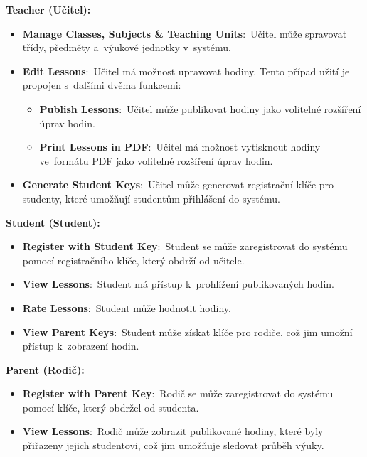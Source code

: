 \documentclass[male,czech,api_bc]{kitheses}
\begin{document}
\textbf{Teacher (Učitel):}
\begin{itemize}
	\item \textbf{Manage Classes, Subjects \& Teaching Units}:~Učitel může spravovat třídy, předměty a~výukové jednotky v~systému.
	\item \textbf{Edit Lessons}:~Učitel má možnost upravovat hodiny. Tento případ užití je propojen s~dalšími dvěma funkcemi:
	\begin{itemize}
		\item \textbf{Publish Lessons}:~Učitel může publikovat hodiny jako volitelné rozšíření úprav hodin.
		\item \textbf{Print Lessons in PDF}:~Učitel má možnost vytisknout hodiny ve~formátu PDF jako volitelné rozšíření úprav hodin.
	\end{itemize}
	\item \textbf{Generate Student Keys}:~Učitel může generovat registrační klíče pro studenty, které umožňují studentům přihlášení do systému.
\end{itemize}

\vspace{1em}
\textbf{Student (Student):}
\begin{itemize}
	\item \textbf{Register with Student Key}:~Student se může zaregistrovat do systému pomocí registračního klíče, který obdrží od učitele.
	\item \textbf{View Lessons}:~Student má přístup k~prohlížení publikovaných hodin.
	\item \textbf{Rate Lessons}:~Student může hodnotit hodiny.
	\item \textbf{View Parent Keys}:~Student může získat klíče pro rodiče, což jim umožní přístup k~zobrazení hodin.
\end{itemize}

\vspace{1em}
\textbf{Parent (Rodič):}
\begin{itemize}
	\item \textbf{Register with Parent Key}:~Rodič se může zaregistrovat do systému pomocí klíče, který obdržel od studenta.
	\item \textbf{View Lessons}:~Rodič může zobrazit publikované hodiny, které byly přiřazeny jejich studentovi, což jim umožňuje sledovat průběh výuky.
\end{itemize}
\end{document}
